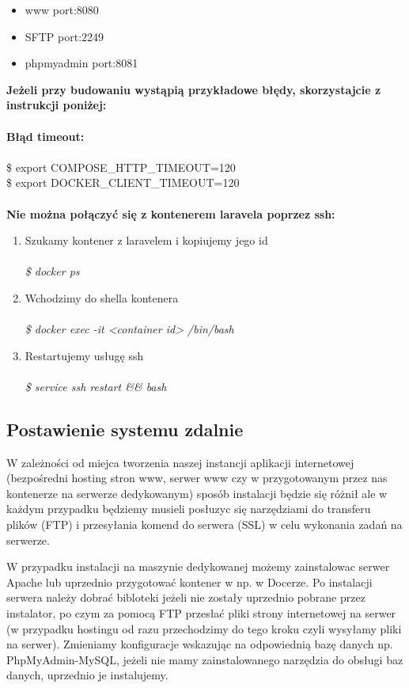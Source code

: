 \documentclass{article}
\begin{document}
    \begin{itemize}
        \item www port:8080
        \item SFTP port:2249
        \item phpmyadmin port:8081
    \end{itemize}
    \textbf{Jeżeli przy budowaniu wystąpią przykładowe błędy, skorzystajcie z instrukcji poniżej:}\\\\
    \textbf{Błąd timeout:}\\\\
    \$ export COMPOSE\_HTTP\_TIMEOUT=120\\
    \$ export DOCKER\_CLIENT\_TIMEOUT=120\\\\
    \textbf{Nie można połączyć się z kontenerem laravela poprzez ssh:}
    \begin{enumerate}
        \item Szukamy kontener z laravelem i kopiujemy jego id\\\\
       \emph{ \$ docker ps}\\
        \item Wchodzimy do shella kontenera\\\\
        \emph{\$ docker exec -it <container id> /bin/bash}\\
        \item Restartujemy usługę ssh\\\\
        \emph{\$ service ssh restart && bash}
    \end{enumerate}

    

\subsection{Postawienie systemu zdalnie}
W zależności od miejca tworzenia naszej instancji aplikacji internetowej (bezpośredni hosting stron www, serwer www czy w przygotowanym przez nas kontenerze na serwerze dedykowanym) sposób instalacji będzie się różnił ale w każdym przypadku będziemy musieli posłuzyc się narzędziami do transferu plików (FTP) i przesyłania komend do serwera (SSL) w celu wykonania zadań na serwerze.

W przypadku instalacji na maszynie dedykowanej możemy zainstalowac serwer Apache lub uprzednio przygotować kontener w np. w Docerze. 
Po instalacji serwera należy dobrać bibloteki jeżeli nie zostały uprzednio pobrane przez instalator, po czym za pomocą FTP przesłać pliki strony internetowej na serwer (w przypadku hostingu od razu przechodzimy do tego kroku czyli wysyłamy pliki na serwer).
Zmieniamy konfiguracje wskazując na odpowiednią bazę danych np. PhpMyAdmin-MySQL, jeżeli nie mamy zainstalowanego narzędzia do obsługi baz danych, uprzednio je instalujemy.
\end{document}
